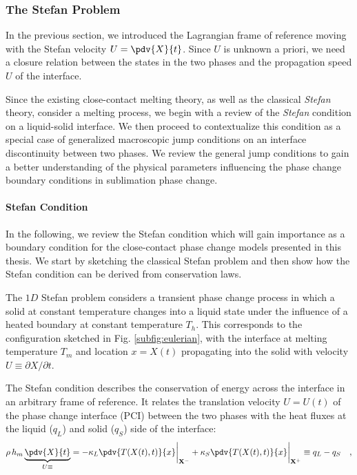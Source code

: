 \subsubsection{The Stefan Problem}\label{sec:stefanproblem}

In the previous section, we introduced the Lagrangian frame of reference moving with the Stefan velocity $U = \pdv{X}{t}$. Since $U$ is unknown a priori, we need a closure relation between the states in the two phases and the propagation speed $U$ of the interface.

Since the existing close-contact melting theory, as well as the classical \textit{Stefan} theory, consider a melting process, we begin with a review of the \textit{Stefan} condition on a liquid-solid interface. We then proceed to contextualize this condition as a special case of generalized macroscopic jump conditions on an interface discontinuity between two phases. We review the general jump conditions to gain a better understanding of the physical parameters influencing the phase change boundary conditions in sublimation phase change.

\paragraph{Stefan Condition}

In the following, we review the Stefan condition which will gain importance as a boundary condition for the close-contact phase change models presented in this thesis. We start by sketching the classical Stefan problem and then show how the Stefan condition can be derived from conservation laws.

The $1D$ Stefan problem \cite{stefan1891theorie} considers a transient phase change process in which a solid at constant temperature changes into a liquid state under the influence of a heated boundary at constant temperature $T_h$. This corresponds to the configuration sketched in Fig. \ref{subfig:eulerian}, with the interface at melting temperature $T_m$ and location $x=X(t)$ propagating into the solid with velocity $U\equiv \partial X / \partial t$. 

The Stefan condition describes the conservation of energy across the interface in an arbitrary frame of reference. It relates the translation velocity $U = U(t)$ of the phase change interface (\gls{PCI}) between the two phases with the heat fluxes at the liquid ($q_L$) and solid ($q_S$) side of the interface:
\begin{equation}\label{eq:1dstefan}
    \rho\, h_m \underbrace{\pdv{X}{t}}_{U\equiv}  = -\kappa_L \pdv{T(X(t),t)}{x}\bigg\rvert_{\mathbf{X}^-} + \kappa_S \pdv{T(X(t),t)}{x}\bigg\rvert_{\mathbf{X}^+} \equiv q_L - q_S \quad ,
\end{equation}

